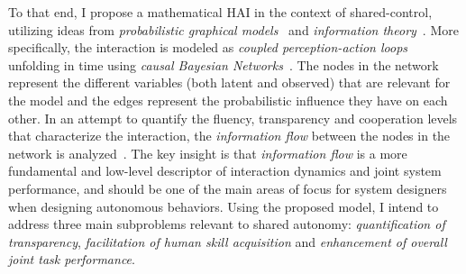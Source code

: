 \documentclass[12pt]{article}
\newcommand{\DGc}[1]{{\textbf{\color{blue}{#1}}}}
\renewcommand{\sout}[1]{\unskip}
\begin{document}
To that end, I propose a mathematical \sout{framework that models} HAI in the context of shared-control, utilizing ideas from \textit{probabilistic graphical models}~\cite{koller2009probabilistic} and \textit{information theory}~\cite{cover2012elements}. More specifically, the interaction is modeled as \textit{coupled perception-action loops} unfolding in time using \textit{causal Bayesian Networks}~\cite{pearl2009causality}. The nodes in the network represent the different variables (both latent and observed) that are relevant for the model and the edges represent the probabilistic influence they have on each other. In an attempt to quantify the fluency, transparency and cooperation levels that characterize the interaction, the \textit{information flow} between the nodes in the network is analyzed~\cite{ay2008information}.  \sout{ Within this proposed framework of causal Bayesian networks, design of autonomy can be thought of as appropriately timed \textit{interventions} that have the potential to alter bidirectional information flow between human and autonomy.}
The key insight is that \textit{information flow} is a more fundamental and low-level descriptor of interaction dynamics and joint system performance, and should be one of the main areas of focus for system designers when designing autonomous behaviors.
Using the proposed model, I intend to address three main subproblems relevant to shared autonomy: \textit{quantification of transparency}, \textit{facilitation of human skill acquisition} and \textit{enhancement of overall joint task performance}.
\end{document}

